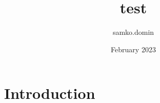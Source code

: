 \documentclass{article}
\title{test}
\author{samko.domin }
\date{February 2023}
\begin{document}
\maketitle

\section{Introduction}
\end{document}
